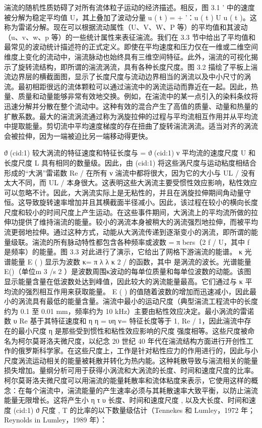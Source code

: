 \documentclass[11pt,a4paper,openany,fontset=none]{ctexbook}
\begin{document}
湍流的随机性质妨碍了对所有流体粒子运动的经济描述。相反，图 3.1 ' 中的速度被分解为稳定平均值 U，其上叠加了波动分量 u ( t ) = + '：u ( t ) U u ( t )。这称为雷诺分解。现在可以根据流动属性（U、V、W、P 等）的平均值和其波动（u、v、w、p 等）的一些统计属性来表征湍流。我们在 3.3 节中给出了平均值和最常见的波动统计描述符的正式定义。即使在平均速度和压力仅在一维或二维空间维度上变化的流动中，湍流脉动也始终具有三维空间特征。此外，湍流的可视化揭示了旋转流结构，即所谓的湍流涡流，具有各种长度尺度。图 3.2 描绘了平板上湍流边界层的横截面图，显示了长度尺度与流动边界相当的涡流以及中小尺寸的涡流。最初相距很远的流体颗粒可以通过湍流中的涡流运动而靠近在一起。因此，热量、质量和动量能够非常有效地交换。例如，在湍流中的某一点引入的染料条纹将迅速分解并分散在整个流动中。这种有效的混合产生了高值的质量、动量和热量的扩散系数。最大的湍流涡流通过称为涡旋拉伸的过程与平均流相互作用并从平均流中提取能量。剪切流中平均速度梯度的存在扭曲了旋转湍流涡流。适当对齐的涡流会被拉伸，因为一端被迫比另一端移动得更快。

ϑ (cid:1) 较大涡流的特征速度和特征长度与 = ϑ (cid:1) ν 平均流的速度尺度 U 和长度尺度 L 具有相同的数量级。因此，由 (cid:1) 将这些涡尺度与运动粘度相结合形成的“大涡”雷诺数 Re / 在所有 ν 湍流中都将很大，因为它的大小与 UL / 没有太大不同，而 UL / 本身很大。这表明这些大涡流主要受惯性效应影响，粘性效应可以忽略不计。因此，大涡流实际上是无粘性的，并且在涡旋拉伸期间角动量守恒。这导致旋转速率增加并且其横截面半径减小。因此，该过程在较小的横向长度尺度和较小的时间尺度上产生运动。在这些事件期间，大涡流上的平均流所做的拉伸功提供了维持湍流的能量。较小的涡流本身被稍大的涡流强烈地拉伸，而被平均流更弱地拉伸。通过这种方式，动能从​​大涡流传递到逐渐变小的涡流，即所谓的能量级联。湍流的所有脉动特性都包含各种频率或波数 = π bers（2 f / U，其中 f 是频率）的能量。图 3.3 对此进行了演示，它给出了网格下游湍流的能谱。 κ 光谱能量 E ( ) 显示为波数 κ= π λ λ κ 2 / 的函数，其中 是涡流的波长。光谱能量E()（单位m 3 /s 2 ）是波数周围κ波动的每单位质量和每单位波数的动能。该图显示能量含量在低波数处达到峰值，因此较大的涡流能量最高。它们通过与 κ 平均流的强烈相互作用来获取能量。 E ( ) 的值随着波数的增加而迅速减小，因此最小的涡流具有最低的能量含量。湍流中最小的运动尺度（典型湍流工程流中的长度约为 0.1 至 0.01 mm，频率约为 10 kHz）主要由粘性效应决定。最小涡流的雷诺数 υ Re 基于其特征速度和 η η = υη ν= 特征长度等于 1, Re / 1，因此湍流中存在的最小尺度 η 是那些受到惯性和粘性效应影响的尺度
强度相等。这些尺度被命名为柯尔莫哥洛夫微尺度，以纪念 20 世纪 40 年代在湍流结构方面进行开创性工作的俄罗斯科学家。在这些尺度上，工作是针对粘性应力的作用进行的，因此与小尺度涡流运动相关的能量被耗散并转化为热内能。这种耗散导致与湍流相关的能量损失增加。量纲分析可用于获得小涡流和大涡流的长度、时间和速度尺度的比率。柯尔莫哥洛夫微尺度可以用湍流的能量耗散率和流体粘度来表示，它使用这样的概念：在每个湍流中，湍流能量的产生速率必须与其耗散速率大致平衡，以防止湍流能量无限增长。这将产生小 η τ υ 长度、时间和速度尺度 , 以及大长度、时间和速度 (cid:1) ϑ 尺度 , T 的比率的以下数量级估计（Tennekes 和 Lumley，1972 年；Reynolds in Lumley，1989 年）：
\end{document}
